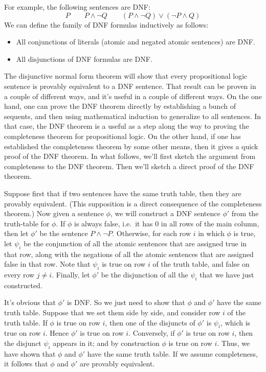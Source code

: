 For example, the following sentences are DNF:
\[ P \qquad P\wedge \neg Q \qquad (P\wedge \neg Q)\vee (\neg P\wedge
  Q) \]
We can define the family of DNF formulas inductively as follows:
\begin{itemize}
\item All conjunctions of literals (atomic and negated atomic sentences) are DNF.
\item All disjunctions of DNF formulas are DNF.
\end{itemize}
The disjunctive normal form theorem will show that every propositional
logic sentence is provably equivalent to a DNF sentence.  That result
can be proven in a couple of different ways, and it's useful in a
couple of different ways.  On the one hand, one can prove the DNF
theorem directly by establishing a bunch of sequents, and then using
mathematical induction to generalize to all sentences.  In that case,
the DNF theorem is a useful as a step along the way to proving the
completeness theorem for propositional logic.  On the other hand, if
one has established the completeness theorem by some other means, then
it gives a quick proof of the DNF theorem.  In what follows, we'll
first sketch the argument from completeness to the DNF theorem.  Then
we'll sketch a direct proof of the DNF theorem.

Suppose first that if two sentences have the same truth table, then
they are provably equivalent.  (This supposition is a direct
consequence of the completeness theorem.)  Now given a sentence
$\phi$, we will construct a DNF sentence $\phi '$ from the truth-table
for $\phi$.  If $\phi$ is always false, i.e.\ it has $0$ in all rows
of the main column, then let $\phi '$ be the sentence
$P\wedge \neg P$.  Otherwise, for each row $i$ in which $\phi$ is
true, let $\psi _i$ be the conjunction of all the atomic sentences
that are assigned true in that row, along with the negations of all
the atomic sentences that are assigned false in that row.  Note that
$\psi _i$ is true on row $i$ of the truth table, and false on every
row $j\neq i$.  Finally, let $\phi '$ be the disjunction of all the
$\psi _i$ that we have just constructed.

It's obvious that $\phi '$ is DNF.  So we just need to show that
$\phi$ and $\phi '$ have the same truth table.  Suppose that we set
them side by side, and consider row $i$ of the truth table.  If $\phi$
is true on row $i$, then one of the disjuncts of $\phi '$ is
$\psi _i$, which is true on row $i$.  Hence $\phi '$ is true on row
$i$.  Conversely, if $\phi '$ is true on row $i$, then the disjunct
$\psi _i$ appears in it; and by construction $\phi$ is true on row
$i$.  Thus, we have shown that $\phi$ and $\phi '$ have the same truth
table.  If we assume completeness, it follows that $\phi$ and $\phi '$
are provably equivalent.

